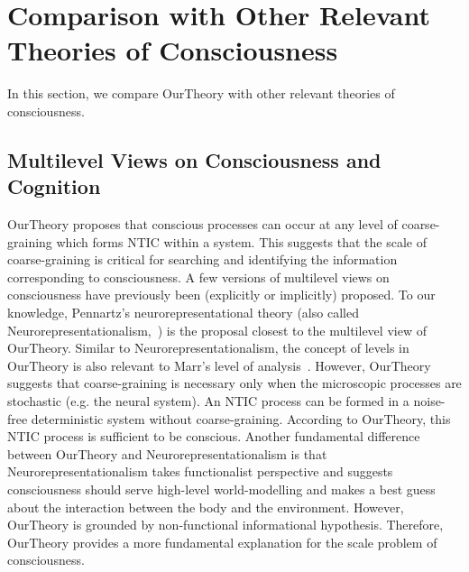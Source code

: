 \documentclass[utf8]{article}
\begin{document}
    \section{Comparison with Other Relevant Theories of Consciousness}\label{sec:Comparison with other theories}
    In this section, we compare \ac{OurTheory} with other relevant theories of consciousness.
	
	
        \subsection{Multilevel Views on Consciousness and Cognition}\label{sec:MultiLevelView}
    		\ac{OurTheory} proposes that conscious processes can occur at any level of coarse-graining which forms NTIC within a system. This suggests that the scale of coarse-graining is critical for searching and identifying the information corresponding to consciousness. A few versions of multilevel views on consciousness have previously been (explicitly or implicitly) proposed. To our knowledge, Pennartz's neurorepresentational theory (also called Neurorepresentationalism,~\citep{pennartz2018consciousness,pennartz2015brain}) is the proposal closest to the multilevel view of \ac{OurTheory}. Similar to Neurorepresentationalism, the concept of levels in \ac{OurTheory} is also relevant to Marr's level of analysis~\citep{marr1982vision, pennartz2015brain, pennartz2018consciousness}. 
    		However, \ac{OurTheory} suggests that coarse-graining is necessary only when the microscopic processes are stochastic (e.g. the neural system). An NTIC process can be formed in a noise-free deterministic system without coarse-graining. According to \ac{OurTheory}, this NTIC process is sufficient to be conscious. 
    		Another fundamental difference between \ac{OurTheory} and Neurorepresentationalism is that Neurorepresentationalism takes functionalist perspective and suggests consciousness should serve high-level world-modelling and makes a best guess about the interaction between the body and the environment. 
    		However, \ac{OurTheory} is grounded by non-functional informational hypothesis. Therefore, \ac{OurTheory} provides a more fundamental explanation for the scale problem of consciousness. 
    		
\end{document}
